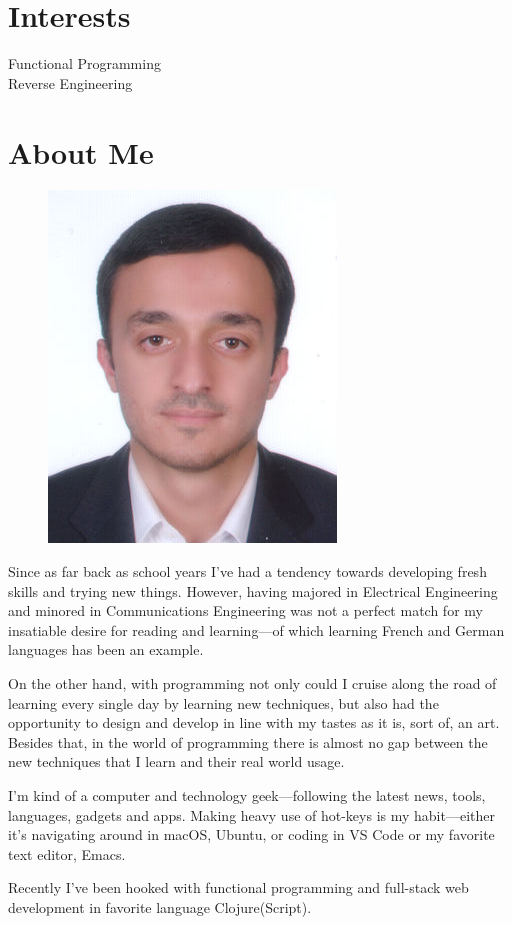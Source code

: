 \documentclass[a4paper,10pt]{article}
\begin{document}
\section{Interests}
Functional Programming\\
Reverse Engineering

\section{About Me}

\begin{figure}
\includegraphics[scale=.25]{resources/me.jpg}
\end{figure}

Since as far back as school years I've had a tendency towards developing fresh skills and trying new things. However, having majored in Electrical Engineering and minored in Communications Engineering was not a perfect match for my insatiable desire for reading and learning---of which learning French and German languages has been an example.

On the other hand, with programming not only could I cruise along the road of learning every single day by learning new techniques, but also had the opportunity to design and develop in line with my tastes as it is, sort of, an art. Besides that, in the world of programming there is almost no gap between the new techniques that I learn and their real world usage.

I'm kind of a computer and technology geek---following the latest news, tools, languages, gadgets and apps. Making heavy use of hot-keys is my habit---either it's navigating around in macOS, Ubuntu, or coding in VS Code or my favorite text editor, Emacs.

Recently I've been hooked with functional programming and full-stack web development in favorite language Clojure(Script).
\end{document}
